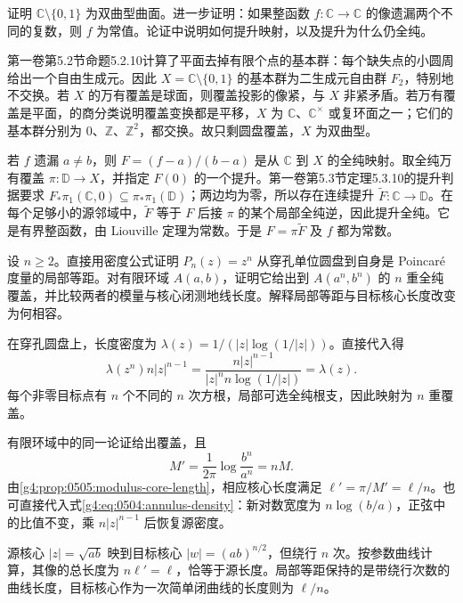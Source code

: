 \begin{exercise}
	\label{g4:ex:0503:two-omitted-values}
	证明 \(\mathbb C\setminus\{0,1\}\) 为双曲型曲面。进一步证明：如果整函数 \(f:\mathbb C\to\mathbb C\) 的像遗漏两个不同的复数，则 \(f\) 为常值。论证中说明如何提升映射，以及提升为什么仍全纯。
\end{exercise}
\begin{solution}
	第一卷第5.2节命题5.2.10计算了平面去掉有限个点的基本群：每个缺失点的小圆周给出一个自由生成元。因此 \(X=\mathbb C\setminus\{0,1\}\) 的基本群为二生成元自由群 \(F_2\)，特别地不交换。若 \(X\) 的万有覆盖是球面，则覆盖投影的像紧，与 \(X\) 非紧矛盾。若万有覆盖是平面，的商分类说明覆盖变换都是平移，\(X\) 为 \(\mathbb C\)、\(\mathbb C^\times\) 或复环面之一；它们的基本群分别为 \(0\)、\(\mathbb Z\)、\(\mathbb Z^2\)，都交换。故只剩圆盘覆盖，\(X\) 为双曲型。

	若 \(f\) 遗漏 \(a\ne b\)，则 \(F=(f-a)/(b-a)\) 是从 \(\mathbb C\) 到 \(X\) 的全纯映射。取全纯万有覆盖 \(\pi:\mathbb D\to X\)，并指定 \(F(0)\) 的一个提升。第一卷第5.3节定理5.3.10的提升判据要求 \(F_*\pi_1(\mathbb C,0)\subseteq\pi_*\pi_1(\mathbb D)\)；两边均为零，所以存在连续提升 \(\widetilde F:\mathbb C\to\mathbb D\)。在每个足够小的源邻域中，\(\widetilde F\) 等于 \(F\) 后接 \(\pi\) 的某个局部全纯逆，因此提升全纯。它是有界整函数，由 Liouville 定理为常数。于是 \(F=\pi\widetilde F\) 及 \(f\) 都为常数。
\end{solution}

\begin{exercise}
	\label{g4:ex:0504:power-coverings}
	设 \(n\ge2\)。直接用密度公式证明 \(P_n(z)=z^n\) 从穿孔单位圆盘到自身是 Poincaré 度量的局部等距。对有限环域 \(A(a,b)\)，证明它给出到 \(A(a^n,b^n)\) 的 \(n\) 重全纯覆盖，并比较两者的模量与核心闭测地线长度。解释局部等距与目标核心长度改变为何相容。
\end{exercise}
\begin{solution}
	在穿孔圆盘上，长度密度为 \(\lambda(z)=1/(|z|\log(1/|z|))\)。直接代入得
	\[
		\lambda(z^n)n|z|^{n-1}
		=\frac{n|z|^{n-1}}{|z|^n n\log(1/|z|)}
		=\lambda(z).
	\]
	每个非零目标点有 \(n\) 个不同的 \(n\) 次方根，局部可选全纯根支，因此映射为 \(n\) 重覆盖。

	有限环域中的同一论证给出覆盖，且
	\[
		M'=\frac1{2\pi}\log\frac{b^n}{a^n}=nM.
	\]
	由\cref{g4:prop:0505:modulus-core-length}，相应核心长度满足 \(\ell'=\pi/M'=\ell/n\)。也可直接代入式\eqref{g4:eq:0504:annulus-density}：新对数宽度为 \(n\log(b/a)\)，正弦中的比值不变，乘 \(n|z|^{n-1}\) 后恢复源密度。

	源核心 \(|z|=\sqrt{ab}\) 映到目标核心 \(|w|=(ab)^{n/2}\)，但绕行 \(n\) 次。按参数曲线计算，其像的总长度为 \(n\ell'=\ell\)，恰等于源长度。局部等距保持的是带绕行次数的曲线长度，目标核心作为一次简单闭曲线的长度则为 \(\ell/n\)。
\end{solution}

